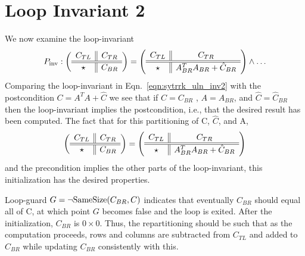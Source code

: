 

\section{Loop Invariant 2}
We now examine the loop-invariant
\begin{equation}
\label{eqn:sytrrk_uln_inv2}
P_{\rm inv}:
\left( \begin{array}{c || c}  C_{TL}  &  C_{TR}  \\ \hline \hline  \star  &  C_{BR}  \end{array} \right)
=
\left( \begin{array}{c || c}  {C}_{TL}  &  {C}_{TR}  \\ \hline \hline  \star  &  A_{BR}^T A_{BR} + \hat{C}_{BR}  \end{array} \right)
\wedge
\ldots
\end{equation}
Comparing the loop-invariant in Eqn.~\ref{eqn:sytrrk_uln_inv2} with the postcondition $ C = A^T A + \hat{C} $
we see that if $ C = C_{BR}$ , $A = A_{BR}$, and $\hat{C} = \hat{C}_{BR}$ then the loop-invariant implies the
postcondition, i.e., that the desired result has been computed. The fact that for this partitioning of
C, $\hat{C}$, and A,
\\
\[
\left( \begin{array}{c || c}  C_{TL}  &  C_{TR}  \\ \hline \hline  \star  &  C_{BR}  \end{array} \right)
=
\left( \begin{array}{c || c}  {C}_{TL}  &  {C}_{TR}  \\ \hline \hline  \star  &  A_{BR}^T A_{BR} + \hat{C}_{BR}  \end{array} \right)
\]
and the precondition implies the other parts of the loop-invariant, this initialization has the desired
properties.

Loop-guard $G = \neg \mbox{SameSize}(C_{BR}, C)$ indicates that eventually $C_{BR}$ should equal all of C, at which
point $G$ becomes false and the loop is exited.  After the initialization, $C_{BR}$ is  $0 \times 0 $. Thus,
the repartitioning should be such that as the computation proceeds, rows and columns are subtracted from $C_{TL} $
and added to $C_{BR}$ while updating $C_{BR}$ consistently with this.

